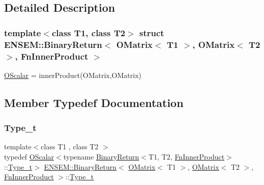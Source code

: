 \subsection{Detailed Description}
\subsubsection*{template$<$class T1, class T2$>$\newline
struct E\+N\+S\+E\+M\+::\+Binary\+Return$<$ O\+Matrix$<$ T1 $>$, O\+Matrix$<$ T2 $>$, Fn\+Inner\+Product $>$}

\mbox{\hyperlink{classENSEM_1_1OScalar}{O\+Scalar}} = inner\+Product(\+O\+Matrix,\+O\+Matrix) 

\subsection{Member Typedef Documentation}
\mbox{\label{structENSEM_1_1BinaryReturn_3_01OMatrix_3_01T1_01_4_00_01OMatrix_3_01T2_01_4_00_01FnInnerProduct_01_4_a28a5e6d9f636db51eb542a0a4602c034}} 
\subsubsection{\texorpdfstring{Type\_t}{Type\_t}\hspace{0.1cm}{\footnotesize\ttfamily [1/3]}}
{\footnotesize\ttfamily template$<$class T1 , class T2 $>$ \\
typedef \mbox{\hyperlink{classENSEM_1_1OScalar}{O\+Scalar}}$<$typename \mbox{\hyperlink{structENSEM_1_1BinaryReturn}{Binary\+Return}}$<$T1, T2, \mbox{\hyperlink{structENSEM_1_1FnInnerProduct}{Fn\+Inner\+Product}}$>$\+::\mbox{\hyperlink{structENSEM_1_1BinaryReturn_3_01OMatrix_3_01T1_01_4_00_01OMatrix_3_01T2_01_4_00_01FnInnerProduct_01_4_a28a5e6d9f636db51eb542a0a4602c034}{Type\+\_\+t}}$>$ \mbox{\hyperlink{structENSEM_1_1BinaryReturn}{E\+N\+S\+E\+M\+::\+Binary\+Return}}$<$ \mbox{\hyperlink{classENSEM_1_1OMatrix}{O\+Matrix}}$<$ T1 $>$, \mbox{\hyperlink{classENSEM_1_1OMatrix}{O\+Matrix}}$<$ T2 $>$, \mbox{\hyperlink{structENSEM_1_1FnInnerProduct}{Fn\+Inner\+Product}} $>$\+::\mbox{\hyperlink{structENSEM_1_1BinaryReturn_3_01OMatrix_3_01T1_01_4_00_01OMatrix_3_01T2_01_4_00_01FnInnerProduct_01_4_a28a5e6d9f636db51eb542a0a4602c034}{Type\+\_\+t}}}


